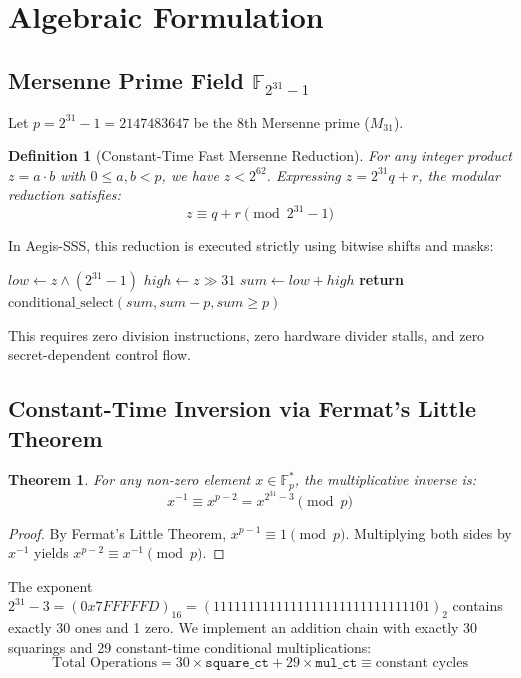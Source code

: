 \documentclass[11pt,a4paper]{article}
\newtheorem{theorem}{Theorem}
\newtheorem{definition}{Definition}
\begin{document}
\section{Algebraic Formulation}

\subsection{Mersenne Prime Field $\mathbb{F}_{2^{31}-1}$}
Let $p = 2^{31} - 1 = 2147483647$ be the 8th Mersenne prime ($M_{31}$). 

\begin{definition}[Constant-Time Fast Mersenne Reduction]
For any integer product $z = a \cdot b$ with $0 \le a, b < p$, we have $z < 2^{62}$. Expressing $z = 2^{31} q + r$, the modular reduction satisfies:
\begin{equation}
z \equiv q + r \pmod{2^{31} - 1}
\end{equation}
\end{definition}

In Aegis-SSS, this reduction is executed strictly using bitwise shifts and masks:
\begin{algorithmic}[1]
\State $low \gets z \land (2^{31} - 1)$
\State $high \gets z \gg 31$
\State $sum \gets low + high$
\State \textbf{return} $\text{conditional\_select}(sum, sum - p, sum \ge p)$
\end{algorithmic}
This requires zero division instructions, zero hardware divider stalls, and zero secret-dependent control flow.

\subsection{Constant-Time Inversion via Fermat's Little Theorem}
\begin{theorem}
For any non-zero element $x \in \mathbb{F}_p^*$, the multiplicative inverse is:
\begin{equation}
x^{-1} \equiv x^{p-2} = x^{2^{31}-3} \pmod p
\end{equation}
\end{theorem}

\begin{proof}
By Fermat's Little Theorem, $x^{p-1} \equiv 1 \pmod p$. Multiplying both sides by $x^{-1}$ yields $x^{p-2} \equiv x^{-1} \pmod p$.
\end{proof}

The exponent $2^{31} - 3 = (0x7FFFFFD)_{16} = (1111111111111111111111111111101)_2$ contains exactly 30 ones and 1 zero. We implement an addition chain with exactly 30 squarings and 29 constant-time conditional multiplications:
\begin{equation}
\text{Total Operations} = 30 \times \mathtt{square\_ct} + 29 \times \mathtt{mul\_ct} \equiv \text{constant cycles}
\end{equation}
\end{document}
